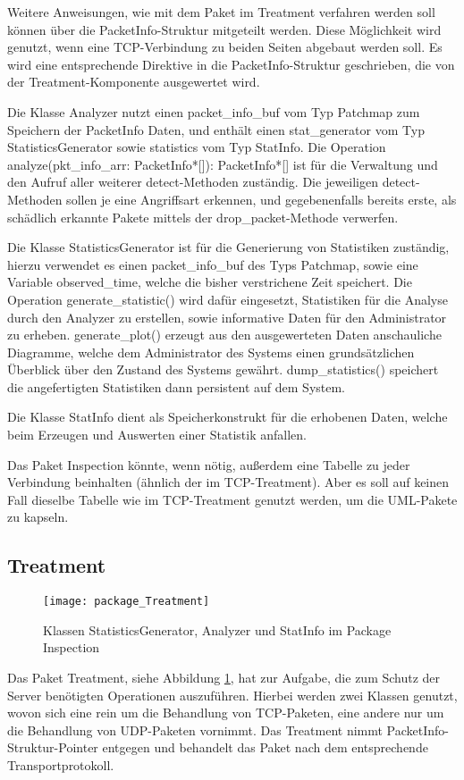 \documentclass[../review_1.tex]{subfiles}
\begin{document}
Weitere Anweisungen, wie mit dem Paket im Treatment verfahren werden soll können über die PacketInfo-Struktur mitgeteilt werden. Diese Möglichkeit wird genutzt, wenn eine TCP-Verbindung zu beiden Seiten abgebaut werden soll. Es wird eine entsprechende Direktive in die PacketInfo-Struktur geschrieben, die von der Treatment-Komponente ausgewertet wird.

Die Klasse Analyzer nutzt einen packet\_info\_buf vom Typ Patchmap zum Speichern der PacketInfo Daten, und enthält einen stat\_generator vom Typ StatisticsGenerator sowie statistics vom Typ StatInfo. Die Operation analyze(pkt\_info\_arr: PacketInfo*[]): PacketInfo*[] ist für die Verwaltung und den Aufruf aller weiterer detect-Methoden zuständig. Die jeweiligen detect-Methoden sollen je eine Angriffsart erkennen, und gegebenenfalls bereits erste, als schädlich erkannte Pakete mittels der drop\_packet-Methode verwerfen.

Die Klasse StatisticsGenerator ist für die Generierung von Statistiken zuständig, hierzu verwendet es einen packet\_info\_buf des Typs Patchmap, sowie eine Variable observed\_time, welche die bisher verstrichene Zeit speichert.
Die Operation generate\_statistic() wird dafür eingesetzt, Statistiken für die Analyse durch den Analyzer zu erstellen, sowie informative Daten für den Administrator zu erheben.
generate\_plot() erzeugt aus den ausgewerteten Daten anschauliche Diagramme, welche dem Administrator des Systems einen grundsätzlichen Überblick über den Zustand des Systems gewährt.
dump\_statistics() speichert die angefertigten Statistiken dann persistent auf dem System.

Die Klasse StatInfo dient als Speicherkonstrukt für die erhobenen Daten, welche beim Erzeugen und Auswerten einer Statistik anfallen.

Das Paket Inspection könnte, wenn nötig, außerdem eine Tabelle zu jeder Verbindung beinhalten (ähnlich der im TCP-Treatment). Aber es soll auf keinen Fall dieselbe Tabelle wie im TCP-Treatment genutzt werden, um die UML-Pakete zu kapseln.

\subsection{Treatment}
\begin{figure} [t]
	\centering
	\texttt{[image: package\_Treatment]}
	\caption{Klassen StatisticsGenerator, Analyzer und StatInfo im Package Inspection}
	\label{fig:Treatment}
\end{figure}
Das Paket Treatment, siehe Abbildung \ref{fig:Treatment}, hat zur Aufgabe, die zum Schutz der Server benötigten Operationen auszuführen. Hierbei werden zwei Klassen genutzt, wovon sich eine rein um die Behandlung von TCP-Paketen, eine andere nur um die Behandlung von UDP-Paketen vornimmt.
Das Treatment nimmt PacketInfo-Struktur-Pointer entgegen und behandelt das Paket nach dem entsprechende Transportprotokoll. 
\end{document}

